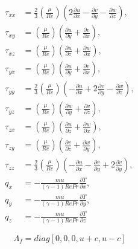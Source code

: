 \documentclass{article}
\begin{document}
\begin{align} \tau_{xx} &= \frac{2}{3}\left(\frac{\mu}{Re}\right)\left(2\frac{\partial u}{\partial x} - \frac{\partial v}{\partial y} - \frac{\partial w}{\partial z}\right),\\ \tau_{xy} &= \left(\frac{\mu}{Re}\right)\left(\frac{\partial u}{\partial y} + \frac{\partial v}{\partial x}\right),\\ \tau_{xz} &= \left(\frac{\mu}{Re}\right)\left(\frac{\partial u}{\partial z} + \frac{\partial w}{\partial x}\right),\\ \tau_{yx} &= \left(\frac{\mu}{Re}\right)\left(\frac{\partial u}{\partial y} + \frac{\partial v}{\partial x}\right),\\ \tau_{yy} &= \frac{2}{3}\left(\frac{\mu}{Re}\right)\left(-\frac{\partial u}{\partial x} +2\frac{\partial v}{\partial y} - \frac{\partial w}{\partial z}\right),\\ \tau_{yz} &= \left(\frac{\mu}{Re}\right)\left(\frac{\partial w}{\partial y} + \frac{\partial v}{\partial z}\right),\\ \tau_{zx} &= \left(\frac{\mu}{Re}\right)\left(\frac{\partial u}{\partial z} + \frac{\partial w}{\partial x}\right),\\ \tau_{zy} &= \left(\frac{\mu}{Re}\right)\left(\frac{\partial v}{\partial z} + \frac{\partial w}{\partial y}\right),\\ \tau_{zz} &= \frac{2}{3}\left(\frac{\mu}{Re}\right)\left(-\frac{\partial u}{\partial x} - \frac{\partial v}{\partial y} + 2\frac{\partial v}{\partial y}\right),\\ q_x &= -\frac{mu}{\left(\gamma-1\right)Re Pr}\frac{\partial T}{\partial x}, \\ q_y &= -\frac{mu}{\left(\gamma-1\right)Re Pr}\frac{\partial T}{\partial y}, \\ q_z &= -\frac{mu}{\left(\gamma-1\right)Re Pr}\frac{\partial T}{\partial z} \end{align}
\pagebreak

\begin{equation} \Lambda_f = diag\left[0,0,0,u+c,u-c \right] \end{equation}
\pagebreak
\end{document}
